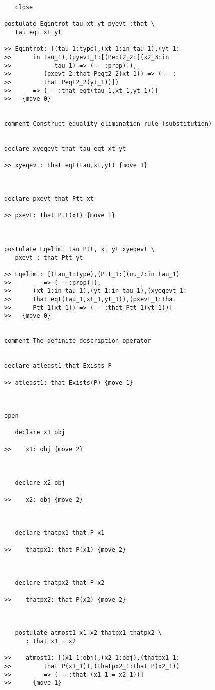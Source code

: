 \documentclass[12pt]{article}
\begin{document}
\begin{verbatim}
   close

postulate Eqintrot tau xt yt pyevt :that \
   tau eqt xt yt

>> Eqintrot: [(tau_1:type),(xt_1:in tau_1),(yt_1:
>>      in tau_1),(pyevt_1:[(Peqt2_2:[(x2_3:in
>>            tau_1) => (---:prop)]),
>>         (pxevt_2:that Peqt2_2(xt_1)) => (---:
>>         that Peqt2_2(yt_1))])
>>      => (---:that eqt(tau_1,xt_1,yt_1))]
>>   {move 0}


comment Construct equality elimination rule (substitution)


declare xyeqevt that tau eqt xt yt

>> xyeqevt: that eqt(tau,xt,yt) {move 1}



declare pxevt that Ptt xt

>> pxevt: that Ptt(xt) {move 1}



postulate Eqelimt tau Ptt, xt yt xyeqevt \
   pxevt : that Ptt yt

>> Eqelimt: [(tau_1:type),(Ptt_1:[(uu_2:in tau_1)
>>         => (---:prop)]),
>>      (xt_1:in tau_1),(yt_1:in tau_1),(xyeqevt_1:
>>      that eqt(tau_1,xt_1,yt_1)),(pxevt_1:that
>>      Ptt_1(xt_1)) => (---:that Ptt_1(yt_1))]
>>   {move 0}


comment The definite description operator


declare atleast1 that Exists P

>> atleast1: that Exists(P) {move 1}



open

   declare x1 obj

>>    x1: obj {move 2}



   declare x2 obj

>>    x2: obj {move 2}



   declare thatpx1 that P x1

>>    thatpx1: that P(x1) {move 2}



   declare thatpx2 that P x2

>>    thatpx2: that P(x2) {move 2}



   postulate atmost1 x1 x2 thatpx1 thatpx2 \
      : that x1 = x2

>>    atmost1: [(x1_1:obj),(x2_1:obj),(thatpx1_1:
>>         that P(x1_1)),(thatpx2_1:that P(x2_1))
>>         => (---:that (x1_1 = x2_1))]
>>      {move 1}




\end{verbatim}
\end{document}
